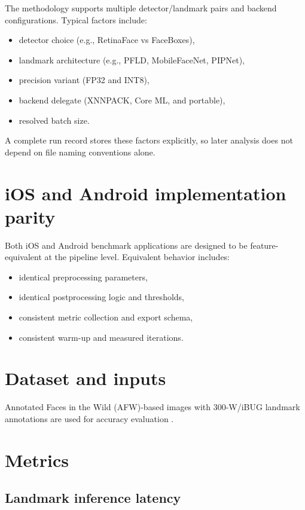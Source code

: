The methodology supports multiple detector/landmark pairs and backend
configurations. Typical factors include:
\begin{itemize}
    \item detector choice (e.g., RetinaFace vs FaceBoxes),
    \item landmark architecture (e.g., PFLD, MobileFaceNet, PIPNet),
    \item precision variant (FP32 and INT8),
    \item backend delegate (XNNPACK, Core ML, and portable),
    \item resolved batch size.
\end{itemize}

A complete run record stores these factors explicitly, so later analysis does
not depend on file naming conventions alone.

\section{iOS and Android implementation parity}

Both iOS and Android benchmark applications are designed 
to be feature-equivalent at the pipeline level.
Equivalent behavior includes:
\begin{itemize}
    \item identical preprocessing parameters,
    \item identical postprocessing logic and thresholds,
    \item consistent metric collection and export schema,
    \item consistent warm-up and measured iterations.
\end{itemize}

\section{Dataset and inputs}

Annotated Faces in the Wild (AFW)-based images with 300-W/iBUG landmark
annotations are used for accuracy evaluation
\cite{zhu2012facedetectionwild,sagonas2013_300w}.

\section{Metrics}

\subsection{Landmark inference latency}

